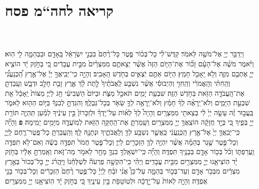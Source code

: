 \documentclass[twoside, openany, parskip=half, 11pt]{book}
\begin{document}
\begin{footnotesize}
\begin{multicols}{2}
\end{multicols}

\section[חה“מ פסח]{קריאה לחה“מ פסח}


\begin{multicols}{2}

\\ \\
וַיְדַבֵּ֥ר יְיָ֖ אֶל־מֹשֶׁ֥ה לֵּאמֹֽר׃ קַדֶּשׁ־לִ֨י כָל־בְּכ֜וֹר פֶּ֤טֶר כָּל־רֶ֨חֶם֙ בִּבְנֵ֣י יִשְׂרָאֵ֔ל בָּֽאָדָ֖ם וּבַבְּהֵמָ֑ה לִ֖י הֽוּא׃ וַיֹּ֨אמֶר מֹשֶׁ֜ה אֶל־הָעָ֗ם זָכ֞וֹר אֶת־הַיּ֤וֹם הַזֶּה֙ אֲשֶׁ֨ר יְצָאתֶ֤ם מִמִּצְרַ֨יִם֙ מִבֵּ֣ית עֲבָדִ֔ים כִּ֚י בְּחֹ֣זֶק יָ֔ד הוֹצִ֧יא יְיָ֛ אֶתְכֶ֖ם מִזֶּ֑ה וְלֹ֥א יֵֽאָכֵ֖ל חָמֵֽץ׃ הַיּ֖וֹם אַתֶּ֣ם יֹֽצְאִ֑ים בְּחֹ֖דֶשׁ הָֽאָבִֽיב׃
 וְהָיָ֣ה כִֽי־יְבִֽיאֲךָ֣ יְיָ֡ אֶל־אֶ֣רֶץ הַֽ֠כְּנַֽעֲנִ֠י וְהַֽחִתִּ֨י וְהָֽאֱמֹרִ֜י וְהַֽחִוִּ֣י וְהַיְבוּסִ֗י אֲשֶׁ֨ר נִשְׁבַּ֤ע לַֽאֲבֹתֶ֨יךָ֙ לָ֣תֶת לָ֔ךְ אֶ֛רֶץ זָבַ֥ת חָלָ֖ב וּדְבָ֑שׁ וְעָֽבַדְתָּ֛ אֶת־הָֽעֲבֹדָ֥ה הַזֹּ֖את בַּחֹ֥דֶשׁ הַזֶּֽה׃ שִׁבְעַ֥ת יָמִ֖ים תֹּאכַ֣ל מַצֹּ֑ת וּבַיּוֹם֙ הַשְּׁבִיעִ֔י חַ֖ג לַיְיָ׃ מַצּוֹת֙ יֵֽאָכֵ֔ל אֵ֖ת שִׁבְעַ֣ת הַיָּמִ֑ים וְלֹא־יֵֽרָאֶ֨ה לְךָ֜ חָמֵ֗ץ וְלֹא־יֵֽרָאֶ֥ה לְךָ֛ שְׂאֹ֖ר בְּכָל־גְּבֻלֶֽךָ׃ וְהִגַּדְתָּ֣ לְבִנְךָ֔ בַּיּ֥וֹם הַה֖וּא לֵאמֹ֑ר בַּֽעֲב֣וּר זֶ֗ה עָשָׂ֤ה יְיָ֙ לִ֔י בְּצֵאתִ֖י מִמִּצְרָֽיִם׃ וְהָיָה֩ לְךָ֙ לְא֜וֹת עַל־יָֽדְךָ֗ וּלְזִכָּרוֹן֙ בֵּ֣ין עֵינֶ֔יךָ לְמַ֗עַן תִּֽהְיֶ֛ה תּוֹרַ֥ת יְיָ֖ בְּפִ֑יךָ כִּ֚י בְּיָ֣ד חֲזָקָ֔ה הוֹצִֽאֲךָ֥ יְיָ֖ מִמִּצְרָֽיִם׃ וְשָֽׁמַרְתָּ֛ אֶת־הַֽחֻקָּ֥ה הַזֹּ֖את לְמֽוֹעֲדָ֑הּ מִיָּמִ֖ים יָמִֽימָה׃ \textbf{פ} 
וְהָיָ֞ה כִּֽי־יְבִֽאֲךָ֤ יְיָ֙ אֶל־אֶ֣רֶץ הַֽכְּנַֽעֲנִ֔י כַּֽאֲשֶׁ֛ר נִשְׁבַּ֥ע לְךָ֖ וְלַֽאֲבֹתֶ֑יךָ וּנְתָנָ֖הּ לָֽךְ׃ וְהַֽעֲבַרְתָּ֥ כָל־פֶּֽטֶר־רֶ֖חֶם לַֽיְיָ֑ וְכָל־פֶּ֣טֶר שֶׁ֣גֶר בְּהֵמָ֗ה אֲשֶׁ֨ר יִהְיֶ֥ה לְךָ֛ הַזְּכָרִ֖ים לַיְיָ׃ וְכָל־פֶּ֤טֶר חֲמֹר֙ תִּפְדֶּ֣ה בְשֶׂ֔ה וְאִם־לֹ֥א תִפְדֶּ֖ה וַֽעֲרַפְתּ֑וֹ וְכֹ֨ל בְּכ֥וֹר אָדָ֛ם בְּבָנֶ֖יךָ תִּפְדֶּֽה׃ וְהָיָ֞ה כִּֽי־יִשְׁאָֽלְךָ֥ בִנְךָ֛ מָחָ֖ר לֵאמֹ֣ר מַה־זֹּ֑את וְאָֽמַרְתָּ֣ אֵלָ֔יו בְּחֹ֣זֶק יָ֗ד הֽוֹצִיאָ֧נוּ יְיָ֛ מִמִּצְרַ֖יִם מִבֵּ֥ית עֲבָדִֽים׃ וַיְהִ֗י כִּֽי־הִקְשָׁ֣ה פַרְעֹה֘ לְשַׁלְּחֵ֒נוּ֒ וַיַּֽהֲרֹ֨ג יְיָ֤ כָּל־בְּכוֹר֙ בְּאֶ֣רֶץ מִצְרַ֔יִם מִבְּכֹ֥ר אָדָ֖ם וְעַד־בְּכ֣וֹר בְּהֵמָ֑ה עַל־כֵּן֩ אֲנִ֨י זֹבֵ֜חַ לַֽיְיָ֗ כָּל־פֶּ֤טֶר רֶ֨חֶם֙ הַזְּכָרִ֔ים וְכָל־בְּכ֥וֹר בָּנַ֖י אֶפְדֶּֽה׃ וְהָיָ֤ה לְאוֹת֙ עַל־יָ֣דְכָ֔ה וּלְטֽוֹטָפֹ֖ת בֵּ֣ין עֵינֶ֑יךָ כִּ֚י בְּחֹ֣זֶק יָ֔ד הֽוֹצִיאָ֥נוּ יְיָ֖ מִמִּצְרָֽיִם׃



\end{multicols}
\end{footnotesize}
\end{document}
